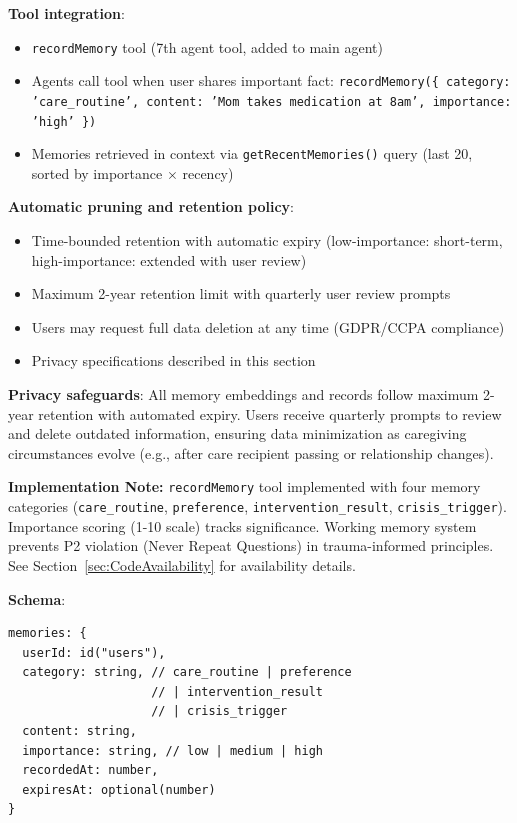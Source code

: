 \documentclass{article}
\begin{document}
\textbf{Tool integration}:
\begin{itemize}
    \item \texttt{recordMemory} tool (7th agent tool, added to main agent)
    \item Agents call tool when user shares important fact: \texttt{recordMemory(\{ category: 'care\_routine', content: 'Mom takes medication at 8am', importance: 'high' \})}
    \item Memories retrieved in context via \texttt{getRecentMemories()} query (last 20, sorted by importance $\times$ recency)
\end{itemize}

\textbf{Automatic pruning and retention policy}:
\begin{itemize}
    \item Time-bounded retention with automatic expiry (low-importance: short-term, high-importance: extended with user review)
    \item Maximum 2-year retention limit with quarterly user review prompts
    \item Users may request full data deletion at any time (GDPR/CCPA compliance)
    \item Privacy specifications described in this section
\end{itemize}

\textbf{Privacy safeguards}: All memory embeddings and records follow maximum 2-year retention with automated expiry. Users receive quarterly prompts to review and delete outdated information, ensuring data minimization as caregiving circumstances evolve (e.g., after care recipient passing or relationship changes).

\textbf{Implementation Note:} \texttt{recordMemory} tool implemented with four memory categories (\texttt{care\_routine}, \texttt{preference}, \texttt{intervention\_result}, \texttt{crisis\_trigger}). Importance scoring (1-10 scale) tracks significance. Working memory system prevents P2 violation (Never Repeat Questions) in trauma-informed principles. See Section~\ref{sec:CodeAvailability} for availability details.


\textbf{Schema}:
\begin{verbatim}
memories: {
  userId: id("users"),
  category: string, // care_routine | preference
                    // | intervention_result
                    // | crisis_trigger
  content: string,
  importance: string, // low | medium | high
  recordedAt: number,
  expiresAt: optional(number)
}
\end{verbatim}
\end{document}
